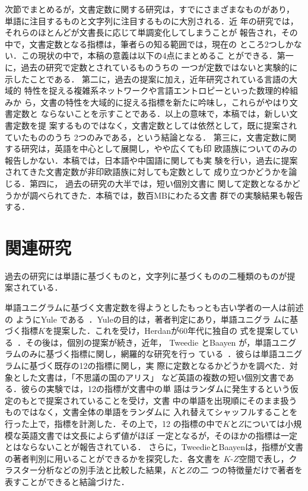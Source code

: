 \documentclass[japanese]{jnlp_JS2.0}
\begin{document}
次節でまとめるが，文書定数に関する研究は，すでにさまざまなものがあり，
単語に注目するものと文字列に注目するものに大別される．近
年の研究では，それらのほとんどが文書長に応じて単調変化してしまうことが
報告され，その中で，文書定数となる指標は，筆者らの知る範囲では，現在の
ところ2つしかない．この現状の中で，本稿の意義は以下の4点にまとめるこ
とができる．第一に，過去の研究で定数とされているものうちの
一つが定数ではないと実験的に示したことである．
第二に，過去の提案に加え，近年研究されている言語の大域的
特性を捉える複雑系ネットワークや言語エントロピーといった数理的枠組みか
ら，文書の特性を大域的に捉える指標を新たに吟味し，これらがやはり文書定数と
ならないことを示すことである．以上の意味で，本稿では，新しい文書定数を提
案するものではなく，文書定数としては依然として，既に提案されていたもののうち 
2つのみである，という結論となる．
第三に，文書定数に関する研究は，英語を中心として展開し，やや広くても印
欧語族についてのみの報告しかない．本稿では，日本語や中国語に関しても実
験を行い，過去に提案されてきた文書定数が非印欧語族に対しても定数として
成り立つかどうかを論じる．第四に， 過去の研究の大半では，短い個別文書に
関して定数となるかどうかが調べられてきた．本稿では，数百MBにわたる文書
群での実験結果も報告する．


\section{関連研究} \label{TandB}

過去の研究には単語に基づくものと，文字列に基づくものの二種類のものが提
案されている．

単語ユニグラムに基づく文書定数を得ようとしたもっとも古い学者の一人は前述の
ようにYule である~\cite{Yule}．Yuleの目的は，著者判定にあり，単語ユニグラ
ムに基づく指標$K$を提案した．これを受け，Herdanが60年代に独自の
式を提案している~\cite{herdan}．その後は，個別の提案が続き，近年，
Tweedie とBaayen が，単語ユニグラムのみに基づく指標に関し，網羅的な研究を行っ
ている~\cite{BaayenTweedie}．彼らは単語ユニグラムに基づく既存の12の指標に関し，実
際に定数となるかどうかを調べた．対象とした文書は，「不思議の国のアリス」
など英語の複数の短い個別文書である．彼らの実験では，12の指標が文書中の単
語はランダムに発生するという仮定のもとで提案されていることを受け，文書
中の単語を出現順にそのまま扱うものではなく，文書全体の単語をランダムに
入れ替えてシャッフルすることを行った上で，指標を計測した．その上で，12
の指標の中で$K$と$Z$については小規模な英語文書では文長によらず値がほぼ
一定となるが，そのほかの指標は一定とはならないことが報告されている．
さらに，TweedieとBaayenは，指標が文書の著者判別に用いることができるかを探究した．各文書を
$K$-$Z$空間で表し，クラスター分析などの別手法と比較した結果，$K$と$Z$の二
つの特徴量だけで著者を表すことができると結論づけた．
\end{document}
